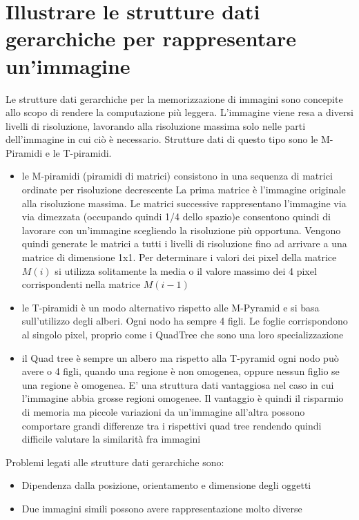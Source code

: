 \section{Illustrare le strutture dati gerarchiche per rappresentare un’immagine}
Le strutture dati gerarchiche per la memorizzazione di immagini sono concepite allo scopo di rendere la computazione più leggera. L'immagine viene resa a diversi livelli di risoluzione, lavorando alla risoluzione massima solo nelle parti dell'immagine in cui ciò è necessario. Strutture dati di questo tipo sono le M-Piramidi e le T-piramidi.
\begin{itemize}
	\item le M-piramidi (piramidi di matrici) consistono in una sequenza di matrici ordinate per risoluzione decrescente La prima matrice è l'immagine originale alla risoluzione	massima. Le matrici successive rappresentano l'immagine via via dimezzata (occupando quindi 1/4	dello spazio)e consentono quindi di lavorare con un'immagine scegliendo la risoluzione più opportuna. Vengono quindi generate le matrici a tutti i livelli di risoluzione fino ad arrivare a una	matrice di dimensione 1x1. Per determinare i valori dei pixel della matrice $M(i)$ si utilizza solitamente la media o il valore massimo dei 4 pixel corrispondenti nella matrice $M(i-1)$
	
	\item le T-piramidi è un modo alternativo rispetto alle M-Pyramid e si basa sull'utilizzo degli alberi. Ogni nodo ha sempre 4 figli. Le foglie corrispondono al singolo pixel, proprio come i QuadTree che sono una loro specializzazione
	
	\item il Quad tree è sempre un albero ma rispetto alla T-pyramid ogni nodo può avere o 4 figli, quando	una regione è non omogenea, oppure nessun figlio se una regione è omogenea. E' una struttura dati vantaggiosa nel caso in cui l'immagine abbia grosse regioni omogenee. Il vantaggio è quindi il risparmio di memoria ma piccole variazioni da un'immagine all'altra possono comportare grandi differenze tra i rispettivi quad tree rendendo quindi difficile valutare la similarità fra immagini
\end{itemize}

Problemi legati alle strutture dati gerarchiche sono:
\begin{itemize}
	\item Dipendenza dalla posizione, orientamento e dimensione degli oggetti
	
	\item Due immagini simili possono avere rappresentazione molto diverse
\end{itemize}

